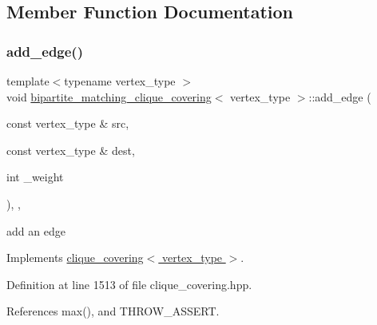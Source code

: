\subsection{Member Function Documentation}
\mbox{\label{classbipartite__matching__clique__covering_abe8fd66049b25b749b5fa2e8254742cc}} 
\subsubsection{\texorpdfstring{add\+\_\+edge()}{add\_edge()}}
{\footnotesize\ttfamily template$<$typename vertex\+\_\+type $>$ \\
void \hyperlink{classbipartite__matching__clique__covering}{bipartite\+\_\+matching\+\_\+clique\+\_\+covering}$<$ vertex\+\_\+type $>$\+::add\+\_\+edge (\begin{DoxyParamCaption}\item[{const vertex\+\_\+type \&}]{src,  }\item[{const vertex\+\_\+type \&}]{dest,  }\item[{int}]{\+\_\+weight }\end{DoxyParamCaption})\hspace{0.3cm}{\ttfamily [inline]}, {\ttfamily [override]}, {\ttfamily [virtual]}}



add an edge 



Implements \hyperlink{classclique__covering_ae8fc02dd0bdb4500dc24bf1fa88f00d4}{clique\+\_\+covering$<$ vertex\+\_\+type $>$}.



Definition at line 1513 of file clique\+\_\+covering.\+hpp.



References max(), and T\+H\+R\+O\+W\+\_\+\+A\+S\+S\+E\+RT.

